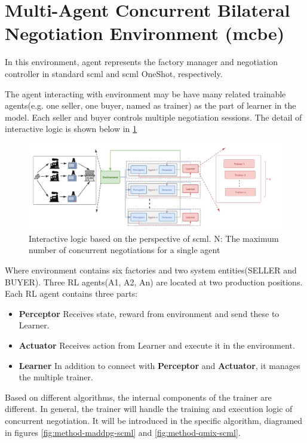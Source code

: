 \section{Multi-Agent Concurrent Bilateral Negotiation Environment (\gls{mcbe})}
In this environment, agent represents the factory manager and negotiation controller in standard \gls{scml} and \gls{scml} OneShot, respectively.

The agent interacting with environment may be have many related trainable agents(e.g. one seller, one buyer, named as trainer) as the part of learner in the model. Each seller and buyer controls multiple negotiation sessions. The detail of interactive logic is shown below in \ref{fig:interacting-logic-scml}

\begin{figure}[htbp]
\centering
\includegraphics[width=1.0\textwidth]{./images/scnk.png}
\caption{Interactive logic based on the perspective of \gls{scml}. N: The maximum number of concurrent negotiations for a single agent}
\label{fig:interacting-logic-scml}
\end{figure}

Where environment contains six factories and two system entities(SELLER and BUYER). Three RL agents(A1, A2, An) are located at two production positions. Each RL agent contains three parts:

\begin{itemize}
\item \textbf{Perceptor} Receives state, reward from environment and send these to Learner.
\item \textbf{Actuator} Receives action from Learner and execute it in the environment.
\item \textbf{Learner} In addition to connect with \textbf{Perceptor} and \textbf{Actuator}, it manages the multiple trainer.
\end{itemize}

Based on different algorithms, the internal components of the trainer are different. In general, the trainer will handle the training and execution logic of concurrent negotiation. It will be introduced in the specific algorithm, diagramed in figures \ref{fig:method-maddpg-scml} and \ref{fig:method-qmix-scml}.

